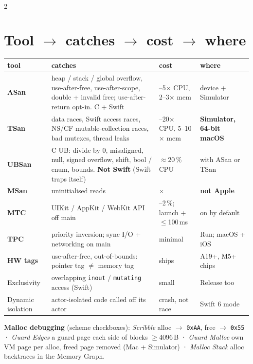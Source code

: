 \documentclass[8pt]{extarticle}
\newcommand\ct[1]{\texttt{#1}}
\begin{document}
\begin{multicols}{2}
\small{}\raggedright

\section{Tool $\to$ catches $\to$ cost $\to$ where}
{\footnotesize\setlength{\tabcolsep}{2.5pt}
\begin{tabular}{@{}>{\raggedright\arraybackslash}p{11mm}>{\raggedright\arraybackslash}p{33mm}>{\raggedright\arraybackslash}p{15mm}>{\raggedright\arraybackslash}p{15mm}@{}}
\toprule
\textbf{tool} & \textbf{catches} & \textbf{cost} & \textbf{where}\\ \midrule
\textbf{ASan} & heap / stack / global overflow, use-after-free, use-after-scope, double + invalid free; use-after-return opt-in. C + Swift & 2–5$\times$ CPU, 2–3$\times$ mem & device + Simulator\\
\textbf{TSan} & data races, Swift access races, NS/CF mutable-collection races, bad mutexes, thread leaks & 2–20$\times$ CPU, 5–10$\times$ mem & \textbf{Simulator, 64-bit macOS}\\
\textbf{UBSan} & C UB: divide by 0, misaligned, null, signed overflow, shift, bool / enum, bounds. \textbf{Not Swift} (Swift traps itself) & $\approx$20\,\% CPU & with ASan or TSan\\
\textbf{MSan} & uninitialised reads & 3$\times$ & \textbf{not Apple}\\
\textbf{MTC} & UIKit / AppKit / WebKit API off main & 1–2\,\%; launch +$\le$100\,ms & on by default\\
\textbf{TPC} & priority inversion; sync I/O + networking on main & minimal & Run; macOS + iOS\\
\textbf{HW tags} & use-after-free, out-of-bounds: pointer tag $\neq$ memory tag & ships & A19+, M5+ chips\\
Exclusivity & overlapping \ct{inout} / \ct{mutating} access (Swift) & small & Release too\\
Dynamic isolation & actor-isolated code called off its actor & crash, not race & Swift 6 mode\\
\bottomrule
\end{tabular}}\par
\textbf{Malloc debugging} (scheme checkboxes): \emph{Scribble} alloc $\to$ \ct{0xAA}, free $\to$
\ct{0x55} · \emph{Guard Edges} a guard page each side of blocks $\ge$4096\,B · \emph{Guard Malloc}
own VM page per alloc, freed page removed (Mac + Simulator) · \emph{Malloc Stack} alloc
backtraces in the Memory Graph.


\end{multicols}
\end{document}
